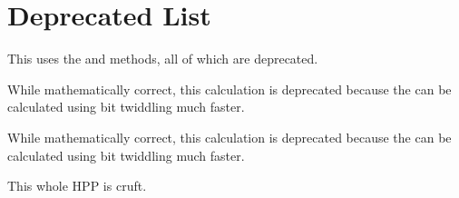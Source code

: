 \chapter{Deprecated List}
\hypertarget{deprecated}{}\label{deprecated}

\begin{DoxyRefList}
\item[Member \doxylink{classBinaryTreeMath_af6c0b21e284c9773e5396e91f9e29b51}{Binary\+Tree\+Math\texorpdfstring{$<$}{<} T \texorpdfstring{$>$}{>}\+::st\+\_\+node\+\_\+value\+\_\+by\+\_\+position\+\_\+and\+\_\+level\+\_\+\+\_\+deprecated} (const T \&position, level\+\_\+t level)]\label{deprecated__deprecated000003}%
%
This uses the {\ttfamily {}} and {\ttfamily {}} methods, all of which are deprecated. 
\item[Member \doxylink{classBinaryTreeMath_a6565799a11e571f5054969d53c38bc7e}{Binary\+Tree\+Math\texorpdfstring{$<$}{<} T \texorpdfstring{$>$}{>}\+::st\+\_\+s1\+\_\+summation} (const T \&position, level\+\_\+t level)]\label{deprecated__deprecated000001}%
%
While mathematically correct, this calculation is deprecated because the {\ttfamily {}} can be calculated using bit twiddling much faster.  
\item[Member \doxylink{classBinaryTreeMath_ab9216463e9936ef2d060c5a5267649a9}{Binary\+Tree\+Math\texorpdfstring{$<$}{<} T \texorpdfstring{$>$}{>}\+::st\+\_\+s2\+\_\+summation} (const T \&position, level\+\_\+t level)]\label{deprecated__deprecated000002}%
%
While mathematically correct, this calculation is deprecated because the {\ttfamily {}} can be calculated using bit twiddling much faster.  
\item[Class \doxylink{classLRUTracker}{LRUTracker\texorpdfstring{$<$}{<} Key \texorpdfstring{$>$}{>}} ]\label{deprecated__deprecated000004}%
%
This whole HPP is cruft. 
\end{DoxyRefList}